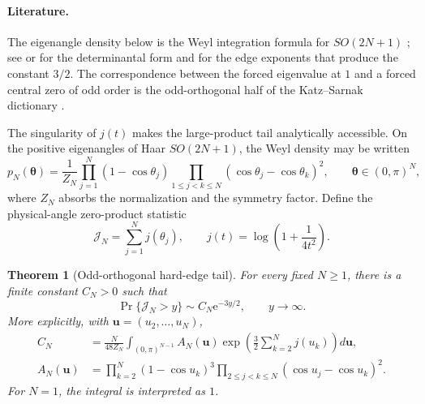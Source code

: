 \documentclass[11pt,reqno]{amsart}
\newtheorem{theorem}{Theorem}
\theoremstyle{remark}
\newcommand{\e}{\mathrm{e}}
\begin{document}
\paragraph{Literature.}
The eigenangle density below is the Weyl integration formula for $SO(2N+1)$ \cite{Weyl1939}; see \cite{Mehta2004} or \cite{Forrester2010} for the determinantal form and for the edge exponents that produce the constant $3/2$.  The correspondence between the forced eigenvalue at $1$ and a forced central zero of odd order is the odd-orthogonal half of the Katz--Sarnak dictionary \cite{KatzSarnak1999,KatzSarnak1999BAMS}.

The singularity of $j(t)$ makes the large-product tail analytically accessible.  On the positive eigenangles of Haar $SO(2N+1)$, the Weyl density may be written
\begin{equation}
  p_N(\boldsymbol\theta)
  =\frac1{Z_N}\prod_{j=1}^{N}(1-\cos\theta_j)
   \prod_{1\le j<k\le N}(\cos\theta_j-\cos\theta_k)^2,
  \qquad \boldsymbol\theta\in(0,\pi)^N,
  \label{eq:SOodd-Weyl-density}
\end{equation}
where $Z_N$ absorbs the normalization and the symmetry factor.  Define the physical-angle zero-product statistic
\begin{equation}
  \mathcal J_N=\sum_{j=1}^{N}j(\theta_j),
  \qquad j(t)=\log\!\left(1+\frac{1}{4t^2}\right).
  \label{eq:RMT-zero-product}
\end{equation}

\begin{theorem}[Odd-orthogonal hard-edge tail]
For every fixed $N\ge1$, there is a finite constant $C_N>0$ such that
\begin{equation}
  \Pr\{\mathcal J_N>y\}
  \sim C_N\e^{-3y/2},
  \qquad y\to\infty.
  \label{eq:hard-edge-tail-law}
\end{equation}
More explicitly, with $\mathbf u=(u_2,\ldots,u_N)$,
\begin{align}
  C_N&=\frac{N}{48Z_N}\int_{(0,\pi)^{N-1}}
  A_N(\mathbf u)
  \exp\!\left(\frac32\sum_{k=2}^{N}j(u_k)\right)d\mathbf u,
  \label{eq:hard-edge-constant}\\
  A_N(\mathbf u)&=
  \prod_{k=2}^{N}(1-\cos u_k)^3
  \prod_{2\le j<k\le N}(\cos u_j-\cos u_k)^2.
  \label{eq:hard-edge-boundary-density}
\end{align}
For $N=1$, the integral is interpreted as $1$.
\end{theorem}
\end{document}
